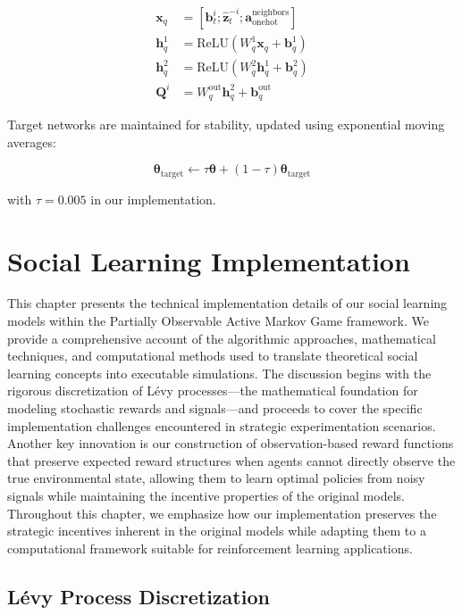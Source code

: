 \begin{align}
    \mathbf{x}_q &= [\mathbf{b}^i_t; \hat{\mathbf{z}}^{-i}_t; \mathbf{a}^{\text{neighbors}}_{\text{onehot}}] \\
    \mathbf{h}^1_q &= \text{ReLU}(W^1_q\mathbf{x}_q + \mathbf{b}^1_q) \\
    \mathbf{h}^2_q &= \text{ReLU}(W^2_q\mathbf{h}^1_q + \mathbf{b}^2_q) \\
    \mathbf{Q}^i &= W^{\text{out}}_q\mathbf{h}^2_q + \mathbf{b}^{\text{out}}_q
\end{align}


Target networks are maintained for stability, updated using exponential moving averages:

\begin{equation}
    \boldsymbol{\theta}_{\text{target}} \leftarrow \tau \boldsymbol{\theta} + (1-\tau)\boldsymbol{\theta}_{\text{target}}
\end{equation}

with $\tau = 0.005$ in our implementation.

\chapter{Social Learning Implementation}

This chapter presents the technical implementation details of our social learning models within the Partially Observable Active Markov Game framework. We provide a comprehensive account of the algorithmic approaches, mathematical techniques, and computational methods used to translate theoretical social learning concepts into executable simulations. The discussion begins with the rigorous discretization of Lévy processes—the mathematical foundation for modeling stochastic rewards and signals—and proceeds to cover the specific implementation challenges encountered in strategic experimentation scenarios. Another key innovation is our construction of observation-based reward functions that preserve expected reward structures when agents cannot directly observe the true environmental state, allowing them to learn optimal policies from noisy signals while maintaining the incentive properties of the original models. Throughout this chapter, we emphasize how our implementation preserves the strategic incentives inherent in the original models while adapting them to a computational framework suitable for reinforcement learning applications.

\section{Lévy Process Discretization}
\label{appendix:levy_discretization}

